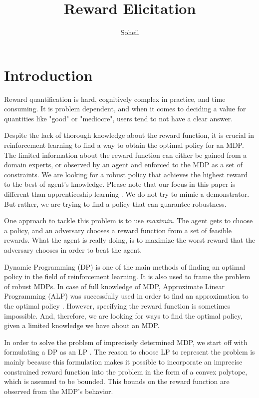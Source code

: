 \documentclass{article}
\title{Reward Elicitation}
\author{Soheil}
\date{}
\theoremstyle{remark}
\theoremstyle{remark}
\theoremstyle{remark}
\theoremstyle{remark}
\theoremstyle{remark}
\theoremstyle{remark}
\begin{document}
\maketitle
\section{Introduction}

Reward quantification is hard, cognitively complex in practice, and time consuming. It is problem dependent, and when it comes to deciding a value for quantities like "good" or "mediocre", users tend to not have a clear answer.


Despite the lack of thorough knowledge about the reward function, it is crucial in reinforcement learning to find a way to obtain the optimal policy for an MDP. The limited information about the reward function can either be gained from a domain experts, or observed by an agent and enforced to the MDP as a set of constraints. We are looking for a robust policy that achieves the highest reward to the best of agent's knowledge. Please note that our focus in this paper is different than apprenticeship learning \cite{abbeel2004}. We do not try to mimic a demonstrator. But rather, we are trying to find a policy that can guarantee robustness.


One approach to tackle this problem is to use \emph{maximin}. The agent gets to choose a policy, and an adversary chooses a reward function from a set of feasible rewards. What the agent is really doing, is to maximize the worst reward that the adversary chooses in order to beat the agent.


Dynamic Programming (DP) is one of the main methods of finding an optimal policy in the field of reinforcement learning. It is also used to frame the problem of robust MDPs. In case of full knowledge of MDP, Approximate Linear Programming (ALP) was successfully used in order to find an approximation to the optimal policy \cite{DeFarias2003}. However, specifying the reward function is sometimes impossible. And, therefore, we are looking for ways to find the optimal policy, given a limited knowledge we have about an MDP.


In order to solve the problem of imprecisely determined MDP, we start off with formulating a DP as an LP \cite{Decision2005c}. The reason to choose LP to represent the problem is mainly because this formulation makes it possible to incorporate an imprecise constrained reward function into the problem in the form of a convex polytope, which is assumed to be bounded. This bounds on the reward function are observed from the MDP's behavior. 
\end{document}
